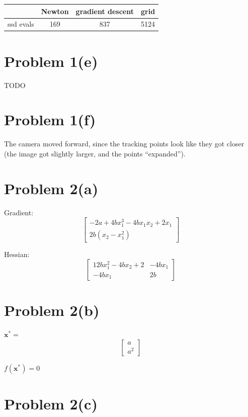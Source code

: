 \documentclass{article}
\begin{document}
\begin{center}
\begin{tabular}{ ||c||c|c|c|| } 
	\hline
				& Newton & gradient descent & grid \\ \hline
	ssd evals 	& 169 & 837 & 5124\\

\hline
\end{tabular}
\end{center}

\section*{Problem 1(e)}

TODO

\section*{Problem 1(f)}

The camera moved forward, since the tracking points look like they got closer (the image got slightly larger, and the points ``expanded'').

\section*{Problem 2(a)}

\begin{center}
Gradient:
\[
	\begin{bmatrix}
		-2a + 4bx_1^3 -4bx_1x_2 + 2x_1\\ 
		2b(x_2-x_1^2)
	\end{bmatrix}
\]

Hessian:
\[
	\begin{bmatrix}
		12bx_1^2-4bx_2+2 & -4bx_1\\
		-4bx_1 & 2b 
	\end{bmatrix}
\]
\end{center}

\section*{Problem 2(b)}


$\mathbf{x^{*}} = $
\[
	\begin{bmatrix}
		a \\
		a^2
	\end{bmatrix}
\]

$f(\mathbf{x^{*}}) = 0$
	

\section*{Problem 2(c)}
\end{document}
